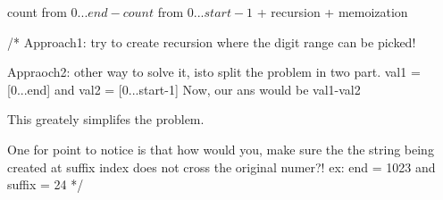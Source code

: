 \begin{solution}[hints]

    \begin{hints}
        count from $0...end - count$ from $0...start-1$
        + recursion 
        + memoization
    \end{hints}
    \begin{code2}
    /*
        Approach1: try to create recursion where the digit range can be picked!

        Appraoch2: other way to solve it, isto split the problem in two part.
            val1 = [0...end] and val2 = [0...start-1] Now, our ans would be val1-val2

            This greately simplifes the problem.

            One for point to notice is that how would you, make sure the the string being created at suffix index does not cross the original numer?!
                ex: end = 1023 and suffix = 24
    */
    \end{code2}
\end{solution}